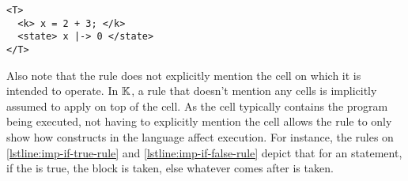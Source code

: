 \begin{lstlisting}[language=k,style=ksty]
<T>
  <k> x = 2 + 3; </k>
  <state> x |-> 0 </state>
</T>
\end{lstlisting}
Also note that the rule does not explicitly mention the cell on which
it is intended to operate. In $\mathbb{K}$, a rule that doesn't
mention any cells is implicitly assumed to apply on top of the
 cell. As the  cell typically
contains the program being executed, not having to explicitly
mention the cell allows the rule to only show how constructs in the language
affect execution. For instance, the rules on \autoref{lstline:imp-if-true-rule}
and \autoref{lstline:imp-if-false-rule} depict that for an
 statement,
if the  is true, the  block is taken,
else whatever comes after is taken.

